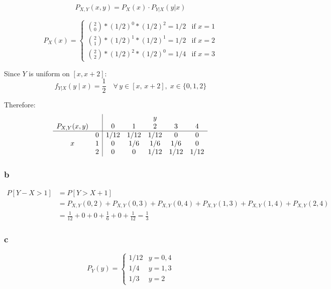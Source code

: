 \documentclass{article}
\begin{document}
\[
	P_{X,Y}(x,y) = P_X(x) \cdot P_{Y|X}(y|x)
\]

\[ P_X(x) = \begin{cases}
		\binom{2}{0} * (1/2)^0 * (1/2)^2 = 1/2 & \text{if } x = 1 \\
		\binom{2}{1} * (1/2)^1 * (1/2)^1 = 1/2 & \text{if } x = 2 \\
		\binom{2}{2} * (1/2)^2 * (1/2)^0 = 1/4 & \text{if } x = 3
	\end{cases}
\]

Since $Y$ is uniform on $[x, x+2]$:
\[ f_{Y|X}(y \mid x) = \frac{1}{2} \quad \forall\, y \in [x,\, x+2],\; x \in \{0, 1, 2\} \]

Therefore:
\[
	\begin{array}{cc|ccccc}
		             &   & \multicolumn{5}{c}{y}                             \\
		P_{X,Y}(x,y) &   & 0                     & 1    & 2    & 3    & 4    \\ \hline
		             & 0 & 1/12                  & 1/12 & 1/12 & 0    & 0    \\
		x            & 1 & 0                     & 1/6  & 1/6  & 1/6  & 0    \\
		             & 2 & 0                     & 0    & 1/12 & 1/12 & 1/12 \\
	\end{array}
\]

\subsubsection*{b}

\begin{align*}
	P[Y - X > 1] & = P[Y > X + 1]                                                                            \\
	             & = P_{X,Y}(0,2) + P_{X,Y}(0,3) + P_{X,Y}(0,4) + P_{X,Y}(1,3) + P_{X,Y}(1,4) + P_{X,Y}(2,4) \\
	             & = \frac{1}{12} + 0 + 0 + \frac{1}{6} + 0 + \frac{1}{12} = \frac{1}{3}
\end{align*}

\subsubsection*{c}

\[
	P_Y(y) =
	\begin{cases}
		1/12 & y = 0, 4 \\
		1/4  & y = 1, 3 \\
		1/3  & y = 2
	\end{cases}
\]
\end{document}
